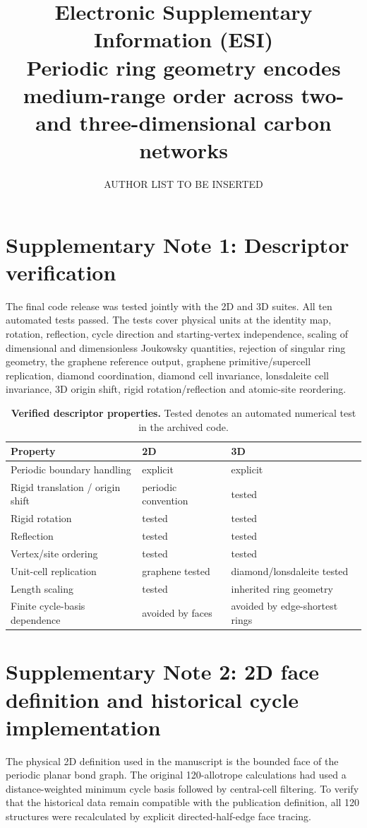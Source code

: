 \documentclass[11pt]{article}
\title{\textbf{Electronic Supplementary Information (ESI)}\\
\large Periodic ring geometry encodes medium-range order across two- and three-dimensional carbon networks}
\author{AUTHOR LIST TO BE INSERTED}
\date{}
\begin{document}
\maketitle

\section*{Supplementary Note 1: Descriptor verification}

The final code release was tested jointly with the 2D and 3D suites. All ten automated tests passed. The tests cover physical units at the identity map, rotation, reflection, cycle direction and starting-vertex independence, scaling of dimensional and dimensionless Joukowsky quantities, rejection of singular ring geometry, the graphene reference output, graphene primitive/supercell replication, diamond coordination, diamond cell invariance, lonsdaleite cell invariance, 3D origin shift, rigid rotation/reflection and atomic-site reordering.

\begin{table}[htbp]
\centering
\caption{\textbf{Verified descriptor properties.} Tested denotes an automated numerical test in the archived code.}
\begin{tabular}{lll}
\toprule
Property & 2D & 3D\\
\midrule
Periodic boundary handling & explicit & explicit\\
Rigid translation / origin shift & periodic convention & tested\\
Rigid rotation & tested & tested\\
Reflection & tested & tested\\
Vertex/site ordering & tested & tested\\
Unit-cell replication & graphene tested & diamond/lonsdaleite tested\\
Length scaling & tested & inherited ring geometry\\
Finite cycle-basis dependence & avoided by faces & avoided by edge-shortest rings\\
\bottomrule
\end{tabular}
\end{table}

\section*{Supplementary Note 2: 2D face definition and historical cycle implementation}

The physical 2D definition used in the manuscript is the bounded face of the periodic planar bond graph. The original 120-allotrope calculations had used a distance-weighted minimum cycle basis followed by central-cell filtering. To verify that the historical data remain compatible with the publication definition, all 120 structures were recalculated by explicit directed-half-edge face tracing.
\end{document}
